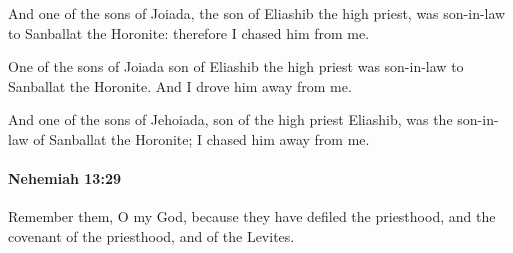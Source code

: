 			\begin{versebox}
					\item[BHS] 
					\item[LXX] 
					\item[ASV] And one of the sons of Joiada, the son of Eliashib the high priest, was son-in-law to Sanballat the Horonite: therefore I chased him from me.
					\item[NIV] One of the sons of Joiada son of Eliashib the high priest was son-in-law to Sanballat the Horonite. And I drove him away from me.
					\item[NRSV] And one of the sons of Jehoiada, son of the high priest Eliashib, was the son-in-law of Sanballat the Horonite; I chased him away from me.
			\end{versebox}

		\paragraph{Nehemiah 13:29} %
			\label{NEHEMIAH-13-29}

			Remember them, O my God, because they have defiled the priesthood, and the covenant of the priesthood, and of the Levites.

